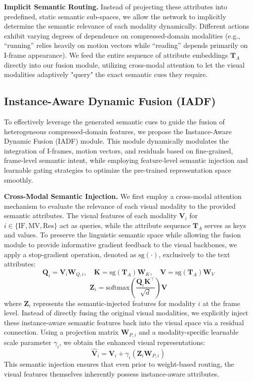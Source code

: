 \documentclass[runningheads]{llncs}
\begin{document}
\noindent\textbf{Implicit Semantic Routing.} 
Instead of projecting these attributes into predefined, static semantic sub-spaces, we allow the network to implicitly determine the semantic relevance of each modality dynamically. Different actions exhibit varying degrees of dependence on compressed-domain modalities (e.g., ``running'' relies heavily on motion vectors while ``reading'' depends primarily on I-frame appearance). We feed the entire sequence of attribute embeddings $\mathbf{T}_A$ directly into our fusion module, utilizing cross-modal attention to let the visual modalities adaptively "query" the exact semantic cues they require.

\subsection{Instance-Aware Dynamic Fusion (IADF)}
\label{sec:fusion}

To effectively leverage the generated semantic cues to guide the fusion of heterogeneous compressed-domain features, we propose the Instance-Aware Dynamic Fusion (IADF) module. This module dynamically modulates the integration of I-frames, motion vectors, and residuals based on fine-grained, frame-level semantic intent, while employing feature-level semantic injection and learnable gating strategies to optimize the pre-trained representation space smoothly.

\noindent\textbf{Cross-Modal Semantic Injection.} 
We first employ a cross-modal attention mechanism to evaluate the relevance of each visual modality to the provided semantic attributes. The visual features of each modality $\mathbf{V}_i$ for $i \in \{\text{IF}, \text{MV}, \text{Res}\}$ act as queries, while the attribute sequence $\mathbf{T}_A$ serves as keys and values. To preserve the linguistic semantic space while allowing the fusion module to provide informative gradient feedback to the visual backbones, we apply a stop-gradient operation, denoted as $\text{sg}(\cdot)$, exclusively to the text attributes:
$$\mathbf{Q}_i = \mathbf{V}_i\mathbf{W}_{Q,i}, \quad \mathbf{K} = \text{sg}(\mathbf{T}_A)\mathbf{W}_K, \quad \mathbf{V} = \text{sg}(\mathbf{T}_A)\mathbf{W}_V$$
$$\mathbf{Z}_i = \text{softmax}\left(\frac{\mathbf{Q}_i \mathbf{K}^\top}{\sqrt{d}}\right)\mathbf{V}$$
where $\mathbf{Z}_i$ represents the semantic-injected features for modality $i$ at the frame level. Instead of directly fusing the original visual modalities, we explicitly inject these instance-aware semantic features back into the visual space via a residual connection. Using a projection matrix $\mathbf{W}_{P,i}$ and a modality-specific learnable scale parameter $\gamma_i$, we obtain the enhanced visual representations:
$$\hat{\mathbf{V}}_i = \mathbf{V}_i + \gamma_i (\mathbf{Z}_i \mathbf{W}_{P,i})$$
This semantic injection ensures that even prior to weight-based routing, the visual features themselves inherently possess instance-aware attributes.
\end{document}
